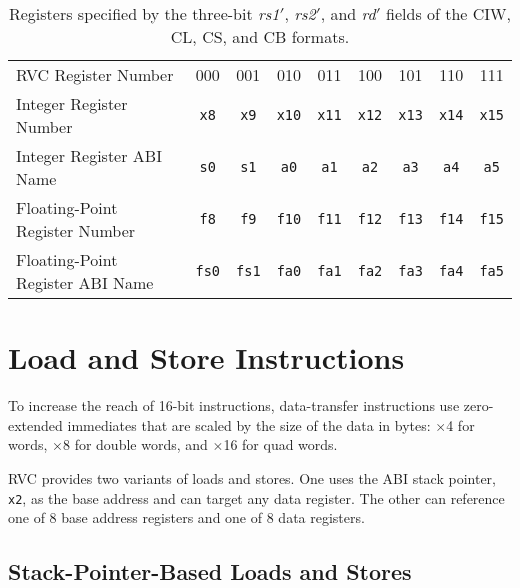 \begin{table}[H]
{
\begin{center}
\begin{tabular}{l|c|c|c|c|c|c|c|c|}
\cline{2-9}
RVC Register Number  & 000 & 001 & 010 & 011 & 100 & 101 & 110 & 111
\\ \cline{2-9}
Integer Register Number & {\tt x8} & {\tt x9} & {\tt x10} & {\tt x11} & {\tt x12} & {\tt x13} & {\tt x14}  & {\tt x15} \\ \cline{2-9}
Integer Register ABI Name    & {\tt s0}  &  {\tt s1} &  {\tt a0} &  {\tt a1} &  {\tt a2} &  {\tt a3} & {\tt a4}  & {\tt a5} \\ \cline{2-9}
Floating-Point Register Number & {\tt f8} & {\tt f9} & {\tt f10} & {\tt f11} & {\tt f12} & {\tt f13} & {\tt f14}  & {\tt f15} \\ \cline{2-9}
Floating-Point Register ABI Name    & {\tt fs0}  &  {\tt fs1} &  {\tt fa0} &  {\tt fa1} &  {\tt fa2} &  {\tt fa3} & {\tt fa4}  & {\tt fa5} \\ \cline{2-9}
\end{tabular}
\end{center}
}
\caption{Registers specified by the three-bit {\em rs1$'$}, {\em rs2$'$}, and {\em rd$'$} fields of the CIW, CL, CS, and CB formats.}
\label{registers}
\end{table}

\section{Load and Store Instructions}

To increase the reach of 16-bit instructions, data-transfer
instructions use zero-extended immediates that are scaled by the size
of the data in bytes: $\times$4 for words, $\times$8 for double words,
and $\times$16 for quad words.

RVC provides two variants of loads and stores.  One uses the ABI stack
pointer, {\tt x2}, as the base address and can target any data register.  The
other can reference one of 8 base address registers and one of 8 data
registers.

\subsection*{Stack-Pointer-Based Loads and Stores}

